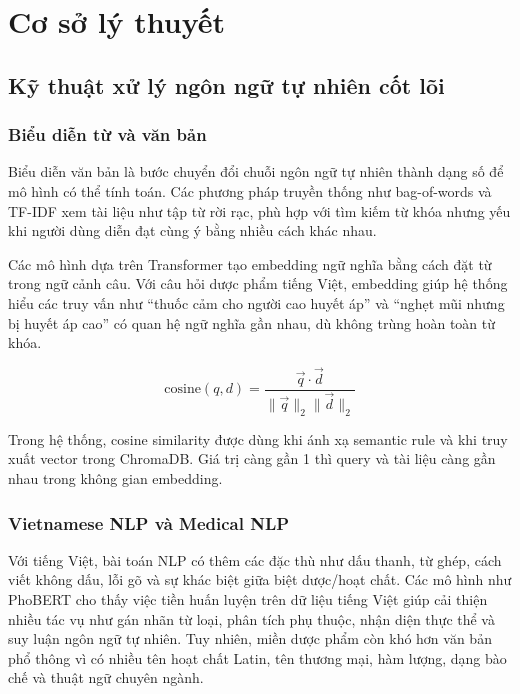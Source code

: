 \chapter{Cơ sở lý thuyết}

\section{Kỹ thuật xử lý ngôn ngữ tự nhiên cốt lõi}

\subsection{Biểu diễn từ và văn bản}

Biểu diễn văn bản là bước chuyển đổi chuỗi ngôn ngữ tự nhiên thành dạng số để mô hình có thể tính toán. Các phương pháp truyền thống như bag-of-words và TF-IDF xem tài liệu như tập từ rời rạc, phù hợp với tìm kiếm từ khóa nhưng yếu khi người dùng diễn đạt cùng ý bằng nhiều cách khác nhau.

Các mô hình dựa trên Transformer tạo embedding ngữ nghĩa bằng cách đặt từ trong ngữ cảnh câu. Với câu hỏi dược phẩm tiếng Việt, embedding giúp hệ thống hiểu các truy vấn như ``thuốc cảm cho người cao huyết áp'' và ``nghẹt mũi nhưng bị huyết áp cao'' có quan hệ ngữ nghĩa gần nhau, dù không trùng hoàn toàn từ khóa.

\begin{formulabox}
\[
\mathrm{cosine}(q,d)=
\frac{\vec{q}\cdot \vec{d}}
{\|\vec{q}\|_2\|\vec{d}\|_2}
\]
\end{formulabox}

Trong hệ thống, cosine similarity được dùng khi ánh xạ semantic rule và khi truy xuất vector trong ChromaDB. Giá trị càng gần 1 thì query và tài liệu càng gần nhau trong không gian embedding.

\subsection{Vietnamese NLP và Medical NLP}

Với tiếng Việt, bài toán NLP có thêm các đặc thù như dấu thanh, từ ghép, cách viết không dấu, lỗi gõ và sự khác biệt giữa biệt dược/hoạt chất. Các mô hình như PhoBERT cho thấy việc tiền huấn luyện trên dữ liệu tiếng Việt giúp cải thiện nhiều tác vụ như gán nhãn từ loại, phân tích phụ thuộc, nhận diện thực thể và suy luận ngôn ngữ tự nhiên. Tuy nhiên, miền dược phẩm còn khó hơn văn bản phổ thông vì có nhiều tên hoạt chất Latin, tên thương mại, hàm lượng, dạng bào chế và thuật ngữ chuyên ngành.

